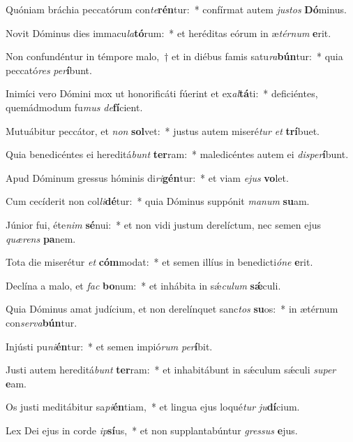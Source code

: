 \item Quóniam bráchia peccatórum con\textit{te}\textbf{rén}tur:~* confírmat autem \textit{jus}\textit{tos} \textbf{Dó}minus.
\item Novit Dóminus dies immacu\textit{la}\textbf{tó}rum:~* et heréditas eórum in æ\textit{tér}\textit{num} \textbf{e}rit.
\item Non confundéntur in témpore malo,~† et in diébus famis satu\textit{ra}\textbf{bún}tur:~* quia peccató\textit{res} \textit{per}\textbf{í}bunt.
\item Inimíci vero Dómini mox ut honorificáti fúerint et ex\textit{al}\textbf{tá}ti:~* deficiéntes, quemádmodum fu\textit{mus} \textit{de}\textbf{fí}cient.
\item Mutuábitur peccátor, et \textit{non} \textbf{sol}vet:~* justus autem miseré\textit{tur} \textit{et} \textbf{trí}buet.
\item Quia benedicéntes ei hereditá\textit{bunt} \textbf{ter}ram:~* maledicéntes autem ei \textit{dis}\textit{per}\textbf{í}bunt.
\item Apud Dóminum gressus hóminis di\textit{ri}\textbf{gén}tur:~* et viam \textit{e}\textit{jus} \textbf{vo}let.
\item Cum cecíderit non col\textit{li}\textbf{dé}tur:~* quia Dóminus suppónit \textit{ma}\textit{num} \textbf{su}am.
\item Júnior fui, éte\textit{nim} \textbf{sé}nui:~* et non vidi justum derelíctum, nec semen ejus \textit{quæ}\textit{rens} \textbf{pa}nem.
\item Tota die miserétur \textit{et} \textbf{cóm}modat:~* et semen illíus in benedicti\textit{ó}\textit{ne} \textbf{e}rit.
\item Declína a malo, et \textit{fac} \textbf{bo}num:~* et inhábita in sǽ\textit{cu}\textit{lum} \textbf{sǽ}culi.
\item Quia Dóminus amat judícium, et non derelínquet sanc\textit{tos} \textbf{su}os:~* in ætérnum con\textit{ser}\textit{va}\textbf{bún}tur.
\item Injústi pu\textit{ni}\textbf{én}tur:~* et semen impió\textit{rum} \textit{per}\textbf{í}bit.
\item Justi autem hereditá\textit{bunt} \textbf{ter}ram:~* et inhabitábunt in sǽculum sǽculi \textit{su}\textit{per} \textbf{e}am.
\item Os justi meditábitur sa\textit{pi}\textbf{én}tiam,~* et lingua ejus loqué\textit{tur} \textit{ju}\textbf{dí}cium.
\item Lex Dei ejus in corde \textit{ip}\textbf{sí}us,~* et non supplantabúntur \textit{gres}\textit{sus} \textbf{e}jus.
